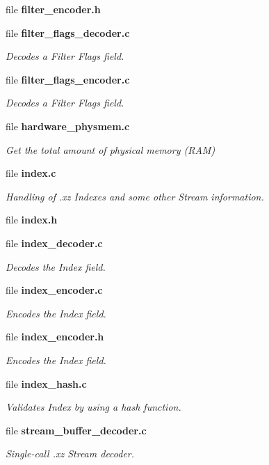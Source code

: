 \begin{DoxyCompactItemize}
file {\bfseries filter\-\_\-encoder.\-h}
\item 
file {\bf filter\-\_\-flags\-\_\-decoder.\-c}
\begin{DoxyCompactList}\small\item\em Decodes a Filter Flags field. \end{DoxyCompactList}\item 
file {\bf filter\-\_\-flags\-\_\-encoder.\-c}
\begin{DoxyCompactList}\small\item\em Decodes a Filter Flags field. \end{DoxyCompactList}\item 
file {\bf hardware\-\_\-physmem.\-c}
\begin{DoxyCompactList}\small\item\em Get the total amount of physical memory (R\-A\-M) \end{DoxyCompactList}\item 
file {\bf index.\-c}
\begin{DoxyCompactList}\small\item\em Handling of .xz Indexes and some other Stream information. \end{DoxyCompactList}\item 
file {\bfseries index.\-h}
\item 
file {\bf index\-\_\-decoder.\-c}
\begin{DoxyCompactList}\small\item\em Decodes the Index field. \end{DoxyCompactList}\item 
file {\bf index\-\_\-encoder.\-c}
\begin{DoxyCompactList}\small\item\em Encodes the Index field. \end{DoxyCompactList}\item 
file {\bf index\-\_\-encoder.\-h}
\begin{DoxyCompactList}\small\item\em Encodes the Index field. \end{DoxyCompactList}\item 
file {\bf index\-\_\-hash.\-c}
\begin{DoxyCompactList}\small\item\em Validates Index by using a hash function. \end{DoxyCompactList}\item 
file {\bf stream\-\_\-buffer\-\_\-decoder.\-c}
\begin{DoxyCompactList}\small\item\em Single-\/call .xz Stream decoder. \end{DoxyCompactList}\item 

\end{DoxyCompactItemize}

